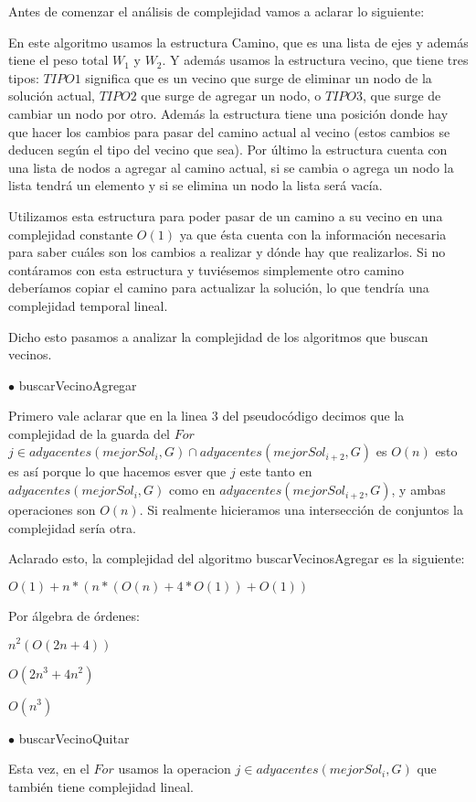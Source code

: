 Antes de comenzar el análisis de complejidad vamos a aclarar lo siguiente:

En este algoritmo usamos la estructura Camino, que es una lista de ejes y además tiene el peso total $W_1$ y $W_2$. Y además usamos la estructura vecino, que tiene tres tipos: $TIPO1$ significa que es un vecino que surge de eliminar un nodo de la solución actual, $TIPO2$ que surge de agregar un nodo, o $TIPO3$, que surge de cambiar un nodo por otro. Además la estructura tiene una posición donde hay que hacer los cambios para pasar del camino actual al vecino (estos cambios se deducen según el tipo del vecino que sea). Por último la estructura cuenta con una lista de nodos a agregar al camino actual, si se cambia o agrega un nodo la lista tendrá un elemento y si se elimina un nodo la lista será vacía.

Utilizamos esta estructura para poder pasar de un camino a su vecino en una complejidad constante $O(1)$ ya que ésta cuenta con la información necesaria para saber cuáles son los cambios a realizar y dónde hay que realizarlos. Si no contáramos con esta estructura y tuviésemos simplemente otro camino deberíamos copiar el camino para actualizar la solución, lo que tendría una complejidad temporal lineal.

Dicho esto pasamos a analizar la complejidad de los algoritmos que buscan vecinos.

$\bullet$ buscarVecinoAgregar

Primero vale aclarar que en la linea $3$ del pseudocódigo decimos que la complejidad de la guarda del $For$ $j \in adyacentes(mejorSol_i,G) \cap adyacentes(mejorSol_{i+2},G)$ es $O(n)$ esto es así porque lo que hacemos esver que $j$ este tanto en $adyacentes(mejorSol_i,G)$ como en $adyacentes(mejorSol_{i+2},G)$, y ambas operaciones son $O(n)$. Si realmente hicieramos una intersección de conjuntos la complejidad sería otra.

Aclarado esto, la complejidad del algoritmo buscarVecinosAgregar es la siguiente:

$O(1) + n*(n*(O(n) +4*O(1))+O(1))$

Por álgebra de órdenes:

$n^2(O(2n+4))$

$O(2n^3+4n^2)$

$O(n^3)$

$\bullet$ buscarVecinoQuitar

Esta vez, en el $For$ usamos la operacion $j \in adyacentes(mejorSol_i, G)$ que también tiene complejidad lineal.

